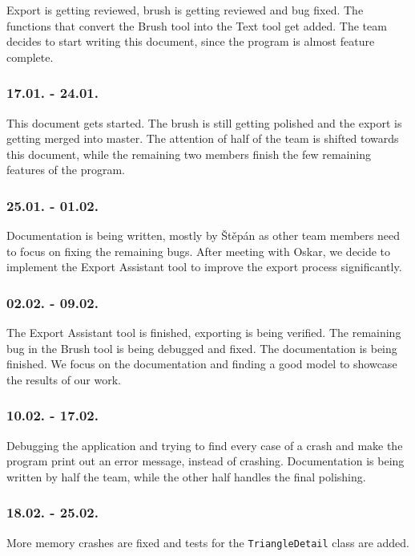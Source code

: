 Export is getting reviewed, brush is getting reviewed and bug fixed. The functions that convert the Brush tool into the Text tool get added. The team decides to start writing this document, since the program is almost feature complete.

\subsubsection{17.01. - 24.01.}

This document gets started. The brush is still getting polished and the export is getting merged into master. The attention of half of the team is shifted towards this document, while the remaining two members finish the few remaining features of the program.

\subsubsection{25.01. - 01.02.}

Documentation is being written, mostly by Štěpán as other team members need to focus on fixing the remaining bugs. After meeting with Oskar, we decide to implement the Export Assistant tool to improve the export process significantly.

\subsubsection{02.02. - 09.02.}

The Export Assistant tool is finished, exporting is being verified. The remaining bug in the Brush tool is being debugged and fixed. The documentation is being finished. We focus on the documentation and finding a good model to showcase the results of our work.

\subsubsection{10.02. - 17.02.}

Debugging the application and trying to find every case of a crash and make the program print out an error message, instead of crashing. Documentation is being written by half the team, while the other half handles the final polishing.

\subsubsection{18.02. - 25.02.}

More memory crashes are fixed and tests for the \texttt{TriangleDetail} class are added.

